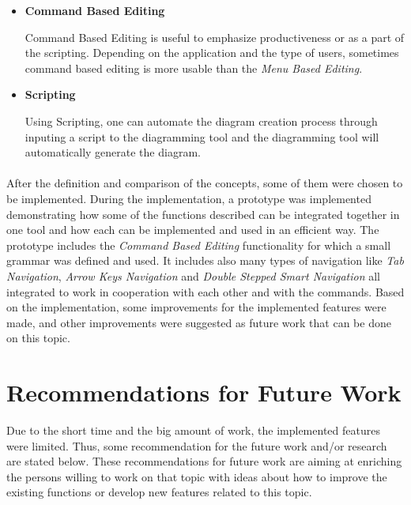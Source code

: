 \begin{itemize}
\begin{itemize}
	\item {\bf Command Based Editing}
	\par \noindent
	Command Based Editing is useful to emphasize productiveness or as a part of the scripting. Depending on the application and the type of users, sometimes command based editing is more usable than the {\em Menu Based Editing}.
	
	\item {\bf Scripting}
	\par \noindent
	Using Scripting, one can automate the diagram creation process through inputing a script to the diagramming tool and the diagramming tool will automatically generate the diagram.
\end{itemize}

\end{itemize}

\paragraph{}
After the definition and comparison of the concepts, some of them were chosen to be implemented. During the implementation, a prototype was implemented demonstrating how some of the functions described can be integrated together in one tool and how each can be implemented and used in an efficient way. The prototype includes the {\em Command Based Editing} functionality for which a small grammar was defined and used. It includes also many types of navigation like {\em Tab Navigation}, {\em Arrow Keys Navigation} and {\em Double Stepped Smart Navigation} all integrated to work in cooperation with each other and with the commands. Based on the implementation, some improvements for the implemented features were made, and other improvements were suggested as future work that can be done on this topic.


\section{Recommendations for Future Work}
Due to the short time and the big amount of work, the implemented features were limited. Thus, some recommendation for the future work and/or research are stated below. These recommendations for future work are aiming at enriching the persons willing to work on that topic with ideas about how to improve the existing functions or develop new features related to this topic.

